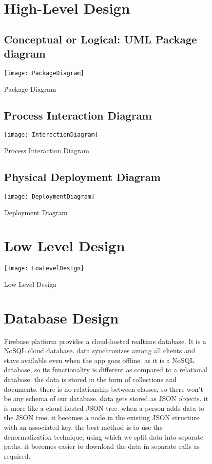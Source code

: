 \begin{figure}
\section{High-Level Design}
\subsection{Conceptual or Logical: UML Package diagram} 
\center
\texttt{[image: PackageDiagram]}
\caption{Package Diagram}
\label{fig:Package Diagram}
\end{figure}

\begin{figure}
\subsection{Process Interaction Diagram}
\center
\texttt{[image: InteractionDiagram]}
\caption{Process Interaction Diagram}
\label{fig:Process Interaction Diagram}
\end{figure}

\begin{figure}
\subsection{Physical Deployment Diagram}
\center
\texttt{[image: DeploymentDiagram]}
\caption{Deployment Diagram}
\label{fig:Deployment Diagram}
\end{figure}

\begin{figure}

\section{Low Level Design} 
\texttt{[image: LowLevelDesign]}
\caption{Low Level Design}
\label{fig:Low Level Design}
\center
\end{figure}

\begin{figure}
\section{Database Design}
Firebase platform provides a cloud-hosted realtime database. It is a NoSQL cloud database. data synchronizes among all clients and stays available even when the app goes offline. as it is a NoSQL database, so its functionality is different as compared to a relational database. the data is stored in the form of collections and documents. there is no relationship between classes, so there won’t be any schema of our database. data gets stored as JSON objects. it is more like a cloud-hosted JSON tree. when a person adds data to the JSON tree, it becomes a node in the existing JSON structure with an associated key. the best method is to use the denormalization technique; using which we split data into separate paths. it becomes easier to download the data in separate calls as required.
\end{figure}

